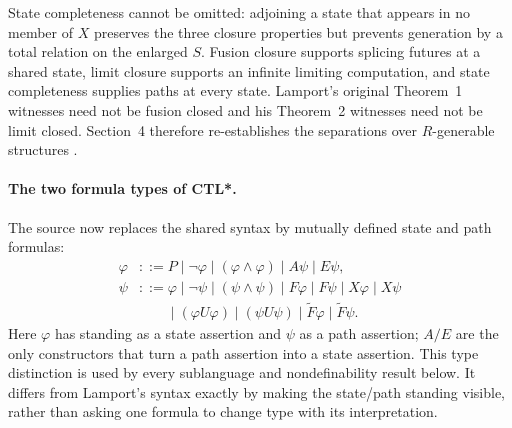 State completeness cannot be omitted: adjoining a state that appears in
no member of \(X\) preserves the three closure properties but prevents
generation by a total relation on the enlarged \(S\).
Fusion closure supports splicing futures at a shared state, limit closure
supports an infinite limiting computation, and state completeness supplies
paths at every state.
Lamport's original
Theorem~1 witnesses need not be fusion closed and his Theorem~2 witnesses
need not be limit closed.  Section~4 therefore re-establishes the
separations over \(R\)-generable structures
\cite[pp.~155--156]{EmersonHalpern1986}.

\paragraph{The two formula types of CTL*.}
The source now replaces the shared syntax by mutually defined state and path
formulas:
\[
\begin{aligned}
 \varphi &::=
 P\mid\neg\varphi\mid(\varphi\land\varphi)
 \mid A\psi\mid E\psi,\\
 \psi &::=
 \varphi\mid\neg\psi\mid(\psi\land\psi)
 \mid F\varphi\mid F\psi
 \mid X\varphi\mid X\psi\\
 &\qquad
 \mid(\varphi U\varphi)\mid(\psi U\psi)
 \mid\widetilde F\varphi\mid\widetilde F\psi.
\end{aligned}
\]
Here \(\varphi\) has standing as a state assertion and \(\psi\) as a path
assertion; \(A/E\) are the only constructors that turn a path assertion into
a state assertion.  This type distinction is used by every sublanguage and
nondefinability result below.  It differs from Lamport's syntax exactly by
making the state/path standing visible, rather than asking one formula to
change type with its interpretation.

